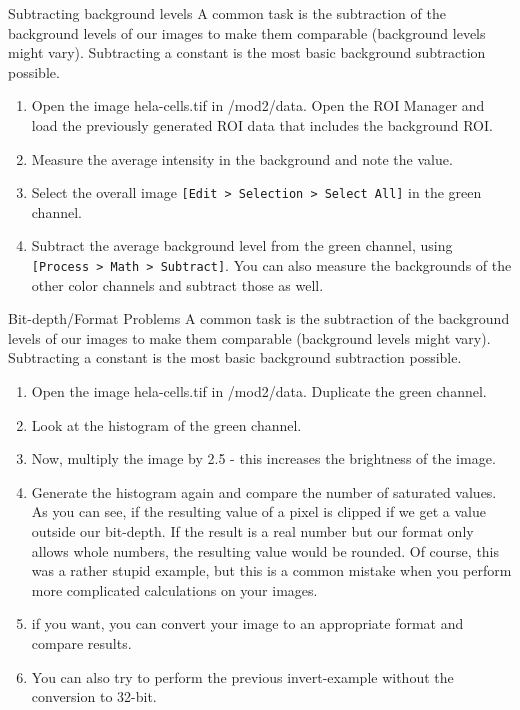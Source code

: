 \begin{taskbox}{Subtracting background levels}
A common task is the subtraction of the background levels of our images to make them comparable (background levels might vary). Subtracting a constant is the most basic background subtraction possible. 

\begin{enumerate}
	\item Open the image hela-cells.tif in /mod2/data. Open the ROI Manager and load the previously generated ROI data that includes the background ROI.
	\item Measure the average intensity in the background and note the value.
	\item Select the overall image \texttt{[Edit > Selection > Select All]} in the green channel. 
	\item Subtract the average background level from the green channel, using \texttt{[Process > Math > Subtract]}. You can also measure the backgrounds of the other color channels and subtract those as well.
\end{enumerate}

\end{taskbox}

\begin{taskbox}{Bit-depth/Format Problems}
A common task is the subtraction of the background levels of our images to make them comparable (background levels might vary). Subtracting a constant is the most basic background subtraction possible. 

\begin{enumerate}
	\item Open the image hela-cells.tif in /mod2/data. Duplicate the green channel.
	\item Look at the histogram of the green channel.
	\item Now, multiply the image by 2.5 - this increases the brightness of the image. 
	\item Generate the histogram again and compare the number of saturated values. As you can see, if the resulting value of a pixel is clipped if we get a value outside our bit-depth. If the result is a real number but our format only allows whole numbers, the resulting value would be rounded. Of course, this was a rather stupid example, but this is a common mistake when you perform more complicated calculations on your images.
	\item if you want, you can convert your image to an appropriate format and compare results.
	\item You can also try to perform the previous invert-example without the conversion to 32-bit.
	\end{enumerate}
	
\end{taskbox}

